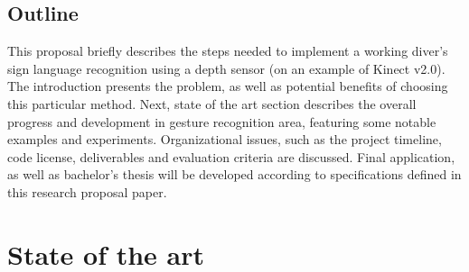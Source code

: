 \documentclass[a4paper,11pt,oneside]{article}
\begin{document}
  \subsection{Outline}
  
  This proposal briefly describes the steps needed to implement a working diver's sign language recognition using a depth sensor (on an example of Kinect v2.0). The introduction presents the problem, as well as potential benefits of choosing this particular method. Next, state of the art section describes the overall progress and development in gesture recognition area, featuring some notable examples and experiments. Organizational issues, such as the project timeline, code license, deliverables and evaluation criteria are discussed. Final application, as well as bachelor's thesis will be developed according to specifications defined in this research proposal paper. 
  
  \section{State of the art}
  
\end{document}
